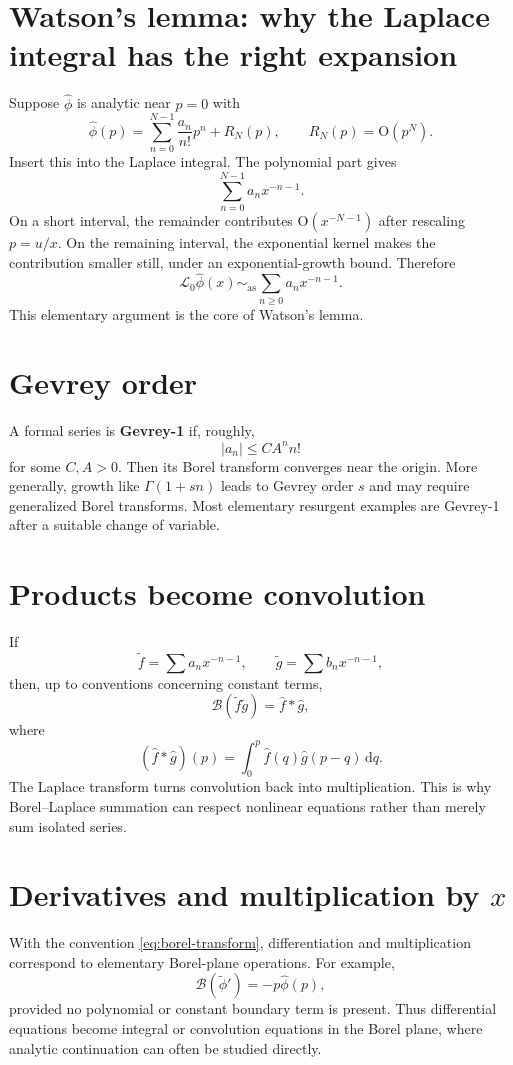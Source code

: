 \documentclass[11pt,openany]{book}
\theoremstyle{plain}
\theoremstyle{definition}
\theoremstyle{remark}
\newcommand{\Borel}{\mathcal{B}}
\newcommand{\Laplace}{\mathcal{L}}
\newcommand{\bigO}{\mathrm{O}}
\newcommand{\dd}{\,\mathrm{d}}
\newcommand{\asympseries}{\sim_{\mathrm{as}}}
\newcommand{\defterm}[1]{\textbf{#1}}
\begin{document}
\section{Watson's lemma: why the Laplace integral has the right expansion}
Suppose $\widehat\phi$ is analytic near $p=0$ with
\[
  \widehat\phi(p)=\sum_{n=0}^{N-1}\frac{a_n}{n!}p^n+R_N(p),
  \qquad R_N(p)=\bigO(p^N).
\]
Insert this into the Laplace integral. The polynomial part gives
\[
  \sum_{n=0}^{N-1}a_nx^{-n-1}.
\]
On a short interval, the remainder contributes $\bigO(x^{-N-1})$ after rescaling $p=u/x$. On the remaining interval, the exponential kernel makes the contribution smaller still, under an exponential-growth bound. Therefore
\[
  \Laplace_0\widehat\phi(x)
  \asympseries\sum_{n\ge0}a_nx^{-n-1}.
\]
This elementary argument is the core of Watson's lemma.

\section{Gevrey order}
A formal series is \defterm{Gevrey-1} if, roughly,
\[
  |a_n|\le CA^n n!
\]
for some $C,A>0$. Then its Borel transform converges near the origin. More generally, growth like $\Gamma(1+sn)$ leads to Gevrey order $s$ and may require generalized Borel transforms. Most elementary resurgent examples are Gevrey-1 after a suitable change of variable.

\section{Products become convolution}
If
\[
  \widetilde f=\sum a_nx^{-n-1},
  \qquad
  \widetilde g=\sum b_nx^{-n-1},
\]
then, up to conventions concerning constant terms,
\[
  \Borel(\widetilde f\widetilde g)
  =\widehat f*\widehat g,
\]
where
\[
  (\widehat f*\widehat g)(p)
  =\int_0^p\widehat f(q)\widehat g(p-q)\dd q.
\]
The Laplace transform turns convolution back into multiplication. This is why Borel--Laplace summation can respect nonlinear equations rather than merely sum isolated series.

\section{\texorpdfstring{Derivatives and multiplication by $x$}{Derivatives and multiplication by x}}
With the convention \cref{eq:borel-transform}, differentiation and multiplication correspond to elementary Borel-plane operations. For example,
\[
  \Borel(\widetilde\phi')=-p\widehat\phi(p),
\]
provided no polynomial or constant boundary term is present. Thus differential equations become integral or convolution equations in the Borel plane, where analytic continuation can often be studied directly.
\end{document}

